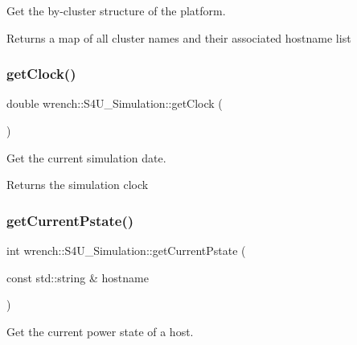 Get the by-\/cluster structure of the platform. 

\begin{DoxyReturn}{Returns}
a map of all cluster names and their associated hostname list 
\end{DoxyReturn}
\mbox{\label{classwrench_1_1_s4_u___simulation_aa6e86b42e87be87991c1e5bdf1a90a55}} 
\subsubsection{\texorpdfstring{get\+Clock()}{getClock()}}
{\footnotesize\ttfamily double wrench\+::\+S4\+U\+\_\+\+Simulation\+::get\+Clock (\begin{DoxyParamCaption}{ }\end{DoxyParamCaption})\hspace{0.3cm}{\ttfamily [static]}}



Get the current simulation date. 

\begin{DoxyReturn}{Returns}
the simulation clock 
\end{DoxyReturn}
\mbox{\label{classwrench_1_1_s4_u___simulation_a203b09c00201a4d4501c25df69c2aca5}} 
\subsubsection{\texorpdfstring{get\+Current\+Pstate()}{getCurrentPstate()}}
{\footnotesize\ttfamily int wrench\+::\+S4\+U\+\_\+\+Simulation\+::get\+Current\+Pstate (\begin{DoxyParamCaption}\item[{const std\+::string \&}]{hostname }\end{DoxyParamCaption})\hspace{0.3cm}{\ttfamily [static]}}



Get the current power state of a host. 


